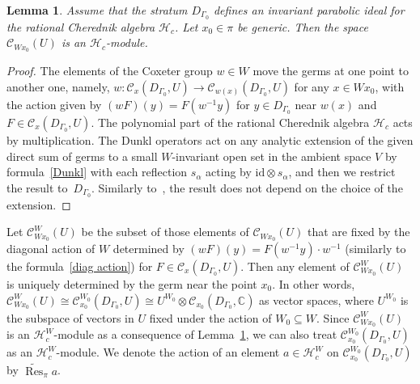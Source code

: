 \documentclass[12pt]{amsart}
\newcommand{\C}{\mathbb C}
\newcommand{\cH}{\mathcal{H}}
\DeclareMathOperator{\Res}{Res}
\numberwithin{equation}{section}
\newtheorem{lemma}[theorem]{Lemma}
\theoremstyle{definition}
\begin{document}
\begin{lemma} \label{invar} 
    Assume that the stratum $D_{\Gamma_{0}}$ defines an invariant parabolic ideal for the rational Cherednik algebra $\cH_c$.  Let $x_0 \in \pi$ be generic. Then the space $\mathcal{C}_{W x_0}(U)$ is an $\cH_c$-module.
\end{lemma}
\begin{proof}
     The elements of the Coxeter group $w \in W$ move the germs at one point to another one, namely, $w\colon  \mathcal{C}_{x}(D_{\Gamma_0}, U) \to \mathcal{C}_{w(x)}(D_{\Gamma_0}, U)$ for any $x \in W x_0$, with the action given by $(wF)(y) = F(w^{-1}y)$ for $y \in D_{\Gamma_0}$ near $w(x)$ and $F \in \mathcal{C}_{x}(D_{\Gamma_0}, U)$. The polynomial part of the rational 
    Cherednik algebra $\cH_c$ acts by multiplication. 
    The Dunkl operators act  on any analytic extension of the given direct sum of germs to a small $W$-invariant open set in the ambient space $V$ by formula~\eqref{Dunkl} with each reflection $s_\alpha$ acting by $\mathrm{id} \otimes s_\alpha$, and then we restrict the result to~$D_{\Gamma_0}$. Similarly to~\cite{Feigin}, the result does not depend on the choice of the extension.
\end{proof}

Let $\mathcal{C}_{Wx_0}^W(U)$ be the subset of those elements of $\mathcal{C}_{Wx_0}(U)$ that are fixed by the diagonal action of $W$ determined by $(wF)(y) = F(w^{-1}y) \cdot w^{-1}$ (similarly to the formula~\eqref{diag action}) for $F \in \mathcal{C}_{x}(D_{\Gamma_0}, U)$.
Then any element of $\mathcal{C}_{Wx_0}^W(U)$ is uniquely determined by the germ near the point $x_0$. In other words, $\mathcal{C}_{Wx_0}^W(U) \cong \mathcal{C}_{x_0}^{W_0}(D_{\Gamma_0},U) \cong  U^{W_0} \otimes \mathcal{C}_{x_0}(D_{\Gamma_0}, \C)$ as vector spaces, where $U^{W_0}$ is the subspace of vectors in $U$ fixed under the action of $W_0 \subseteq W$. Since $\mathcal{C}_{Wx_0}^W(U)$ is an $\cH_c^W$-module as a consequence of Lemma~\ref{invar}, we can also treat $\mathcal{C}_{x_0}^{W_0}(D_{\Gamma_0},U)$ as an $\cH_c^W$-module. We denote the action of an element $a \in \cH_c^W$ on $\mathcal{C}_{x_0}^{W_0}(D_{\Gamma_0},U)$ by $\widetilde{\Res}_{\pi} a$.
\end{document}
